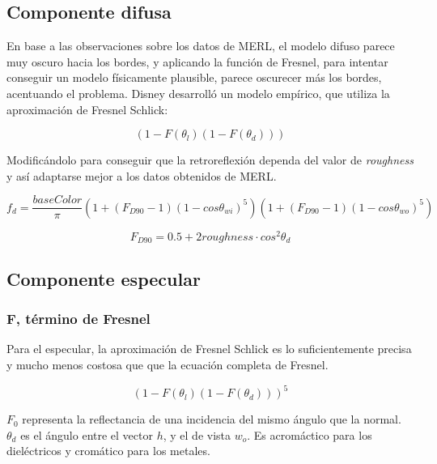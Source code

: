         \subsection{Componente difusa}
    
        En base a las observaciones sobre los datos de MERL, el modelo difuso parece muy oscuro hacia los bordes, y aplicando
        la funci\'on de Fresnel, para intentar conseguir un modelo f\'isicamente plausible, parece oscurecer m\'as los bordes,
        acentuando el problema. Disney desarroll\'o un modelo emp\'irico, que utiliza la aproximaci\'on de Fresnel Schlick:
    
        \begin{equation}
            (1 - F(\theta_l) (1 - F(\theta_d)))
        \end{equation}
        \singlespacing
    
    
        Modific\'andolo para conseguir que la retroreflexi\'on dependa del valor de \textit{roughness} y as\'i
        adaptarse mejor a los datos obtenidos de MERL.
    
        \begin{equation}
        f_d = \frac{baseColor}{\pi}
        \left(  1 + (F_{D90} - 1)(1 - cos\theta_{wi})^5  \right)
        \left(  1 + (F_{D90} - 1)(1 - cos\theta_{wo})^5  \right)
        \end{equation}
        
        $$
        F_{D90} = 0.5 + 2roughness\cdot{cos^2\theta_d}
        $$
    
        \subsection{Componente especular}
            \subsubsection{F, t\'ermino de Fresnel}
                Para el especular, la aproximaci\'on de Fresnel Schlick es lo suficientemente precisa y mucho menos costosa que
                que la ecuaci\'on completa de Fresnel.
    
                \begin{equation}
                (1 - F(\theta_l) (1 - F(\theta_d)))^5
                \end{equation}
    
                $F_0$ representa la reflectancia de una incidencia del mismo \'angulo que la normal. $\theta_d$ es el \'angulo
                entre el vector $h$, y el de vista $w_o$. Es acrom\'actico para los diel\'ectricos y crom\'atico para los metales.
    
